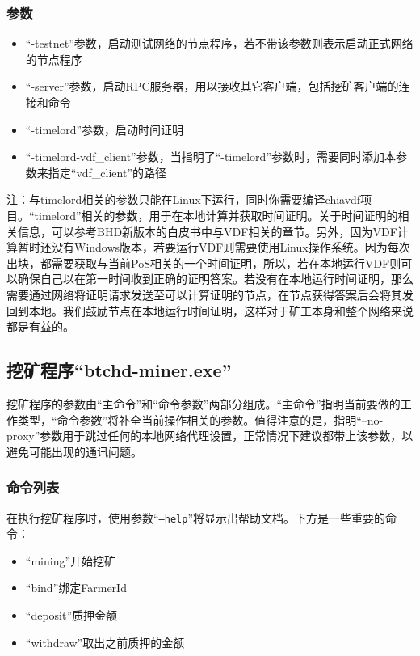 \subsubsection{参数}
\begin{itemize}
    \item ``-testnet''参数，启动测试网络的节点程序，若不带该参数则表示启动正式网络的节点程序
    \item ``-server''参数，启动RPC服务器，用以接收其它客户端，包括挖矿客户端的连接和命令
    \item ``-timelord''参数，启动时间证明
    \item ``-timelord-vdf\_client''参数，当指明了``-timelord''参数时，需要同时添加本参数来指定``vdf\_client''的路径
\end{itemize}
\begin{flushleft}
    注：与timelord相关的参数只能在Linux下运行，同时你需要编译chiavdf项目。``timelord''相关的参数，用于在本地计算并获取时间证明。关于时间证明的相关信息，可以参考BHD新版本的白皮书中与VDF相关的章节。另外，因为VDF计算暂时还没有Windows版本，若要运行VDF则需要使用Linux操作系统。因为每次出块，都需要获取与当前PoS相关的一个时间证明，所以，若在本地运行VDF则可以确保自己以在第一时间收到正确的证明答案。若没有在本地运行时间证明，那么需要通过网络将证明请求发送至可以计算证明的节点，在节点获得答案后会将其发回到本地。我们鼓励节点在本地运行时间证明，这样对于矿工本身和整个网络来说都是有益的。
\end{flushleft}\subsection{挖矿程序``btchd-miner.exe''}
\begin{flushleft}
    挖矿程序的参数由``主命令''和``命令参数''两部分组成。``主命令''指明当前要做的工作类型，``命令参数''将补全当前操作相关的参数。值得注意的是，指明``--no-proxy''参数用于跳过任何的本地网络代理设置，正常情况下建议都带上该参数，以避免可能出现的通讯问题。
\end{flushleft}
\subsubsection{命令列表}
\begin{flushleft}
    在执行挖矿程序时，使用参数``\texttt{--help}''将显示出帮助文档。下方是一些重要的命令：
\end{flushleft}
\begin{itemize}
    \item ``mining''开始挖矿
    \item ``bind''绑定FarmerId
    \item ``deposit''质押金额
    \item ``withdraw''取出之前质押的金额
\end{itemize}
